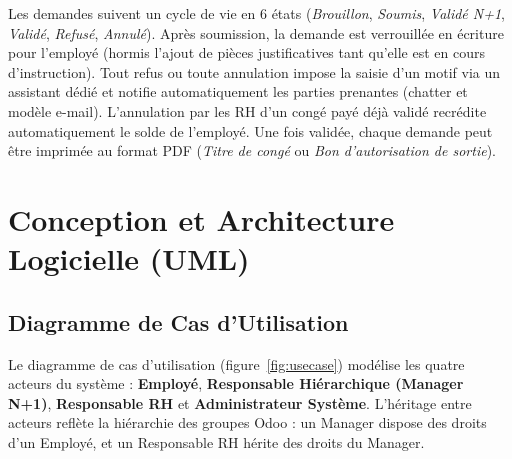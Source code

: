 \documentclass[11pt,a4paper]{article}
\begin{document}
Les demandes suivent un cycle de vie en 6 états (\textit{Brouillon}, \textit{Soumis}, \textit{Validé N+1}, \textit{Validé}, \textit{Refusé}, \textit{Annulé}). Après soumission, la demande est verrouillée en écriture pour l'employé (hormis l'ajout de pièces justificatives tant qu'elle est en cours d'instruction). Tout refus ou toute annulation impose la saisie d'un motif via un assistant dédié et notifie automatiquement les parties prenantes (chatter et modèle e-mail). L'annulation par les RH d'un congé payé déjà validé recrédite automatiquement le solde de l'employé. Une fois validée, chaque demande peut être imprimée au format PDF (\textit{Titre de congé} ou \textit{Bon d'autorisation de sortie}).

\section{Conception et Architecture Logicielle (UML)}

\subsection{Diagramme de Cas d'Utilisation}
Le diagramme de cas d'utilisation (figure~\ref{fig:usecase}) modélise les quatre acteurs du système : \textbf{Employé}, \textbf{Responsable Hiérarchique (Manager N+1)}, \textbf{Responsable RH} et \textbf{Administrateur Système}. L'héritage entre acteurs reflète la hiérarchie des groupes Odoo : un Manager dispose des droits d'un Employé, et un Responsable RH hérite des droits du Manager.
\end{document}
